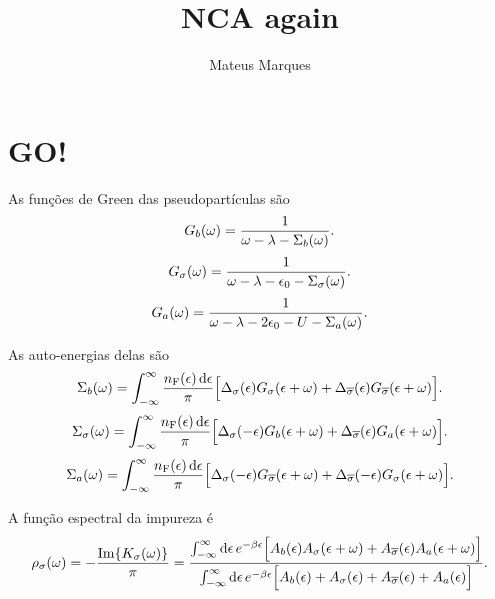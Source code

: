 \documentclass[a4paper,fleqn,12pt]{article}
\title{\Huge{\textbf{NCA again}}}
\author{Mateus Marques}
\begin{document}
\maketitle

\section{GO!}
As funções de Green das pseudopartículas são
$$
G_b(\omega) = \frac{1}{\omega - \lambda - \Sigma_b(\omega)}.
$$
$$
G_{\sigma}(\omega) = \frac{1}{\omega - \lambda - \epsilon_0 - \Sigma_\sigma(\omega)}.
$$
$$
G_a(\omega) = \frac{1}{\omega - \lambda - 2\epsilon_0 - U - \Sigma_a(\omega)}.
$$

As auto-energias delas são
$$
\Sigma_b(\omega) = \int_{-\infty}^{\infty} \frac{n_\text{F}(\epsilon) \dd{\epsilon}}{\pi}
\Big[
\Delta_\sigma(\epsilon) G_\sigma(\epsilon+\omega) + \Delta_{\overline{\sigma}}(\epsilon) G_{\overline{\sigma}}(\epsilon+\omega)
\Big].
$$
$$
\Sigma_\sigma(\omega) = \int_{-\infty}^{\infty} \frac{n_\text{F}(\epsilon) \dd{\epsilon}}{\pi}
\Big[
\Delta_\sigma(-\epsilon) G_b(\epsilon+\omega) + \Delta_{\overline{\sigma}}(\epsilon) G_a(\epsilon+\omega)
\Big].
$$
$$
\Sigma_a(\omega) = \int_{-\infty}^{\infty} \frac{n_\text{F}(\epsilon) \dd{\epsilon}}{\pi}
\Big[
\Delta_\sigma(-\epsilon) G_{\overline{\sigma}}(\epsilon+\omega) + \Delta_{\overline{\sigma}}(-\epsilon) G_\sigma(\epsilon+\omega)
\Big].
$$

A função espectral da impureza é
$$
\rho_\sigma(\omega) = - \frac{\Im{K_\sigma(\omega)}}{\pi} =
\frac{\int_{-\infty}^{\infty} \dd{\epsilon} e^{-\beta \epsilon}
\Big[A_b(\epsilon)A_\sigma(\epsilon+\omega) + A_{\overline{\sigma}}(\epsilon) A_a(\epsilon + \omega)\Big]}
{\int_{-\infty}^{\infty} \dd{\epsilon} e^{-\beta \epsilon}
\Big[A_b(\epsilon) + A_\sigma(\epsilon) + A_{\overline{\sigma}}(\epsilon) +  A_a(\epsilon)\Big]}.
$$
\end{document}
